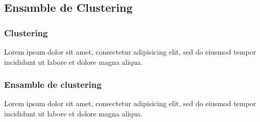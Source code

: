 \subsection{Ensamble de Clustering}
\begin{frame}[allowframebreaks]
	\frametitle{Clustering}
	Lorem ipsum dolor sit amet, consectetur adipisicing elit, sed do eiusmod tempor incididunt ut labore et dolore magna aliqua.
\end{frame}

\begin{frame}[allowframebreaks]
	\frametitle{Ensamble de clustering}
	Lorem ipsum dolor sit amet, consectetur adipisicing elit, sed do eiusmod tempor incididunt ut labore et dolore magna aliqua.
\end{frame}